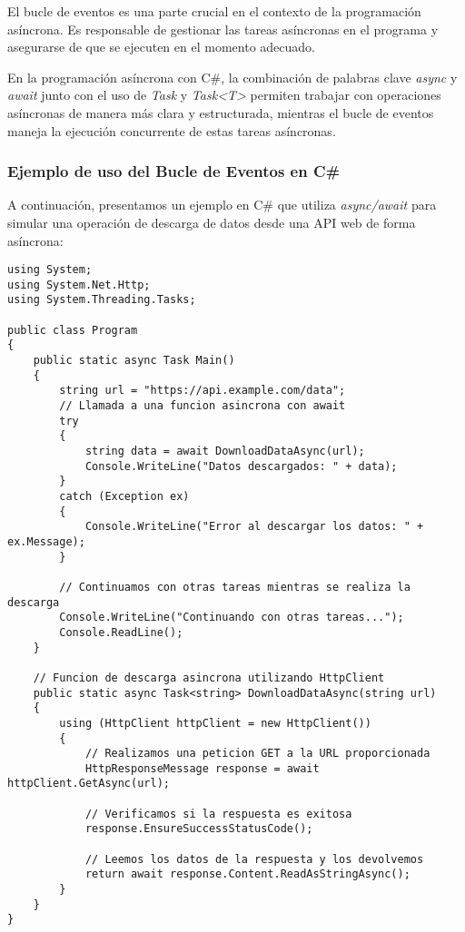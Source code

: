 \documentclass[executivepaper]{article}
\begin{document}
El bucle de eventos es una parte crucial en el contexto de la programación asíncrona. Es responsable de gestionar las tareas asíncronas en el programa y asegurarse de que se ejecuten en el momento adecuado.

En la programación asíncrona con C\#, la combinación de palabras clave \emph{async} y \emph{await} junto con el uso de \emph{Task} y \emph{Task<T>} permiten trabajar con operaciones asíncronas de manera más clara y estructurada, mientras el bucle de eventos maneja la ejecución concurrente de estas tareas asíncronas.

\subsubsection*{Ejemplo de uso del Bucle de Eventos en C\#}

A continuación, presentamos un ejemplo en C\# que utiliza \emph{async/await} para simular una operación de descarga de datos desde una API web de forma asíncrona:

\begin{lstlisting}
using System;
using System.Net.Http;
using System.Threading.Tasks;

public class Program
{
    public static async Task Main()
    {
        string url = "https://api.example.com/data";
        // Llamada a una funcion asincrona con await
        try
        {
            string data = await DownloadDataAsync(url);
            Console.WriteLine("Datos descargados: " + data);
        }
        catch (Exception ex)
        {
            Console.WriteLine("Error al descargar los datos: " + ex.Message);
        }
    
        // Continuamos con otras tareas mientras se realiza la descarga
        Console.WriteLine("Continuando con otras tareas...");
        Console.ReadLine();
    }
    
    // Funcion de descarga asincrona utilizando HttpClient
    public static async Task<string> DownloadDataAsync(string url)
    {
        using (HttpClient httpClient = new HttpClient())
        {
            // Realizamos una peticion GET a la URL proporcionada
            HttpResponseMessage response = await httpClient.GetAsync(url);
    
            // Verificamos si la respuesta es exitosa
            response.EnsureSuccessStatusCode();
    
            // Leemos los datos de la respuesta y los devolvemos
            return await response.Content.ReadAsStringAsync();
        }
    }
}
\end{lstlisting}
\end{document}
